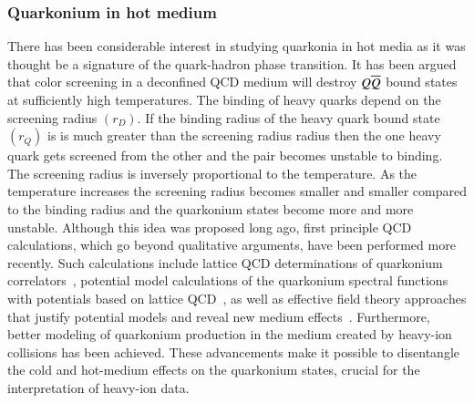 \subsubsection{Quarkonium in hot medium}
\label{sec:media_sec3}
There has been considerable interest in studying quarkonia 
in hot media as it was thought be a signature of the quark-hadron phase transition. 
It has been argued that color screening 
in a deconfined QCD medium will destroy $Q \overline{Q}$ bound states
at sufficiently high temperatures. The binding of heavy quarks depend on the 
screening radius $(r_D)$. If the binding radius of the heavy quark bound state 
$(r_Q)$ is is much greater than the screening radius radius then the one heavy 
quark gets screened from the other and the pair becomes unstable to binding. 
The screening radius is inversely proportional to the temperature. As the temperature 
increases the screening radius becomes smaller and smaller compared to the 
binding radius and the quarkonium states become more and more unstable. 
Although 
this idea was proposed long ago, first principle QCD calculations, 
which go beyond qualitative arguments, have been performed more recently. 
Such calculations include lattice QCD determinations of quarkonium 
correlators~\cite{Umeda:2002vr,Asakawa:2003re,Datta:2003ww,Jakovac:2006sf,Aarts:2007pk},
potential model calculations 
of the quarkonium spectral functions with potentials based on lattice 
QCD~\cite{Digal:2001ue,Wong:2004zr,Mocsy:2005qw,Mocsy:2004bv,Alberico:2006vw,Cabrera:2006wh,Mocsy:2007yj,Mocsy:2007jz},
as well as effective 
field theory approaches that justify potential models and reveal new medium 
effects~\cite{Laine:2007qy,Laine:2007gj,Laine:2008cf,Brambilla:2008cx}.  
Furthermore, better modeling of 
quarkonium production in the medium created by heavy-ion collisions has 
been achieved.   These advancements make it possible to disentangle the cold
and hot-medium effects on the quarkonium states, crucial for the 
interpretation of heavy-ion data. 




